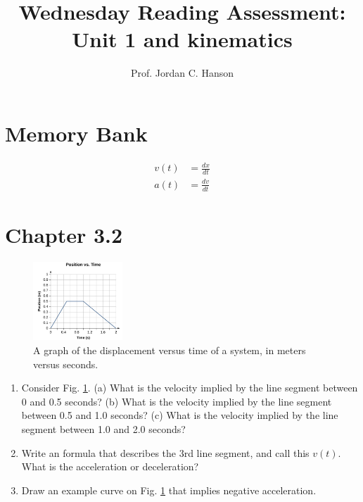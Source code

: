 \documentclass{article}
\begin{document}
\title{Wednesday Reading Assessment: Unit 1 and kinematics}
\author{Prof. Jordan C. Hanson}

\maketitle

\section{Memory Bank}

\begin{align}
v(t) &= \frac{dx}{dt} \\
a(t) &= \frac{dv}{dt}
\end{align}

\section{Chapter 3.2}

\begin{figure}[ht]
\centering
\includegraphics[width=0.3\textwidth]{figures/x_vs_t.png}
\caption{\label{fig:graph} A graph of the displacement versus time of a system, in meters versus seconds.}
\end{figure}

\begin{enumerate}
\item Consider Fig. \ref{fig:graph}.  (a) What is the velocity implied by the line segment between 0 and 0.5 seconds? (b) What is the velocity implied by the line segment between 0.5 and 1.0 seconds? (c) What is the velocity implied by the line segment between 1.0 and 2.0 seconds? \\ \vspace{1cm}
\item Write an formula that describes the 3rd line segment, and call this $v(t)$.  What is the acceleration or deceleration? \\ \vspace{2cm}
\item Draw an example curve on Fig. \ref{fig:graph} that implies negative acceleration.
\end{enumerate}
\end{document}
